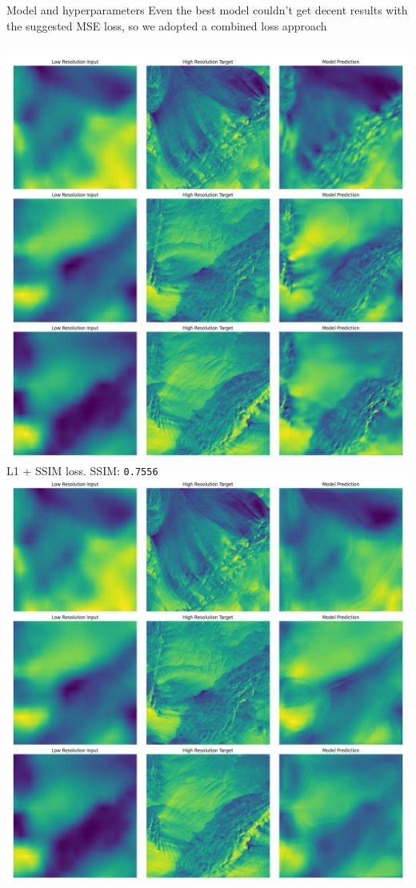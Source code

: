 \documentclass[8pt]{beamer}
\begin{document}
\begin{frame}{Model and hyperparameters}
    Even the best model couldn't get decent results with the suggested MSE loss, so we adopted a combined loss approach
    \begin{columns}
            \includegraphics[width=\linewidth]{images/unet_vectors_l1ssim_loss_200_epochs_4_batch_1em3_lr_1em5_weightdecay.png}
            \newline
            \centering \small L1 + SSIM loss. SSIM: \texttt{0.7556}
            \includegraphics[width=\linewidth]{images/unet_vectors_mse_loss_200_epochs_4_batch_1em3_lr_1em5_weightdecay.png}

\end{columns}
\end{frame}
\end{document}
